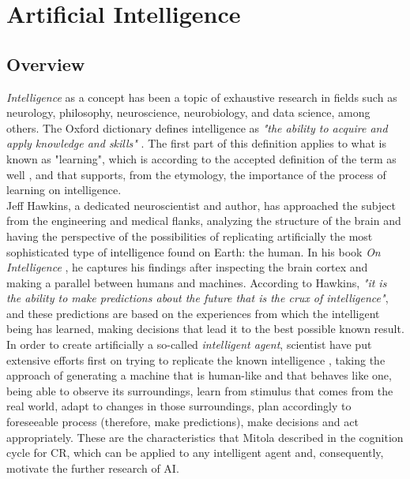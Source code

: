 \acresetall
\chapter{Artificial Intelligence}\label{ch:ml_intro}

\section{Overview}
\emph{Intelligence} as a concept has been a topic of exhaustive research in fields such as neurology, philosophy, neuroscience, neurobiology, and data science, among others. The Oxford dictionary defines intelligence as \emph{"the ability to acquire and apply knowledge and skills"} \cite{Oxforda}. The first part of this definition applies to what is known as "learning", which is according to the accepted definition of the term as well \cite{Oxford}, and that supports, from the etymology, the importance of the process of learning on intelligence.\\

Jeff Hawkins, a dedicated neuroscientist and author, has approached the subject from the engineering and medical flanks, analyzing the structure of the brain and having the perspective of the possibilities of replicating artificially the most sophisticated type of intelligence found on Earth: the human. In his book \emph{On Intelligence} \cite{HawkinsJeff2004}, he captures his findings after inspecting the brain cortex and making a parallel between humans and machines. According to Hawkins, \emph{"it is the ability to make predictions about the future that is the crux of intelligence"}, and these predictions are based on the experiences from which the intelligent being has learned, making decisions that lead it to the best possible known result. In order to create artificially a so-called \emph{intelligent agent}, scientist have put extensive efforts first on trying to replicate the known intelligence \cite{Brooks1991}\cite{Reed2007}\cite{Hawkins}, taking the approach of generating a machine that is human-like and that behaves like one, being able to observe its surroundings, learn from stimulus that comes from the real world, adapt to changes in those surroundings, plan accordingly to foreseeable process (therefore, make predictions), make decisions and act appropriately. These are the characteristics that Mitola \cite{Mitola1999} described in the cognition cycle for \ac{CR}, which can be applied to any intelligent agent and, consequently, motivate the further research of \ac{AI}.\\

